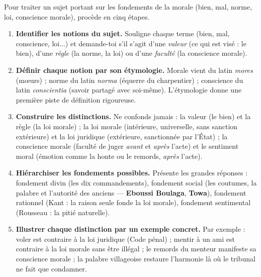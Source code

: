 \documentclass[11pt]{article}
\begin{document}
\begin{methode}
Pour traiter un sujet portant sur les fondements de la morale (bien, mal, norme, loi, conscience morale), procède en cinq étapes.
\begin{enumerate}
\item \textbf{Identifier les notions du sujet.} Souligne chaque terme (bien, mal, conscience, loi...) et demande-toi s'il s'agit d'une \emph{valeur} (ce qui est visé : le bien), d'une \emph{règle} (la norme, la loi) ou d'une \emph{faculté} (la conscience morale).
\item \textbf{Définir chaque notion par son étymologie.} Morale vient du latin \emph{mores} (mœurs) ; norme du latin \emph{norma} (équerre du charpentier) ; conscience du latin \emph{conscientia} (savoir partagé avec soi-même). L'étymologie donne une première piste de définition rigoureuse.
\item \textbf{Construire les distinctions.} Ne confonds jamais : la valeur (le bien) et la règle (la loi morale) ; la loi morale (intérieure, universelle, sans sanction extérieure) et la loi juridique (extérieure, sanctionnée par l'État) ; la conscience morale (faculté de juger \emph{avant} et \emph{après} l'acte) et le sentiment moral (émotion comme la honte ou le remords, \emph{après} l'acte).
\item \textbf{Hiérarchiser les fondements possibles.} Présente les grandes réponses : fondement divin (les dix commandements), fondement social (les coutumes, la palabre et l'autorité des anciens — \textbf{Eboussi Boulaga}, \textbf{Towa}), fondement rationnel (Kant : la raison seule fonde la loi morale), fondement sentimental (Rousseau : la pitié naturelle).
\item \textbf{Illustrer chaque distinction par un exemple concret.} Par exemple : voler est contraire à la loi juridique (Code pénal) ; mentir à un ami est contraire à la loi morale sans être illégal ; le remords du menteur manifeste sa conscience morale ; la palabre villageoise restaure l'harmonie là où le tribunal ne fait que condamner.
\end{enumerate}
\end{methode}
\end{document}
